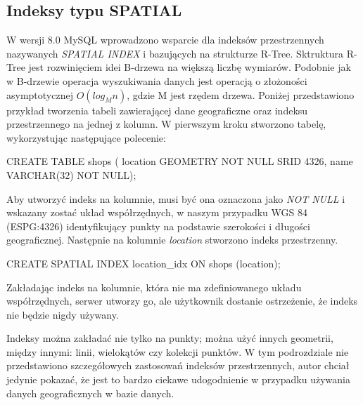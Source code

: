 \subsection{Indeksy typu SPATIAL}
W wersji 8.0 MySQL wprowadzono wsparcie dla indeksów przestrzennych nazywanych \textit{SPATIAL INDEX} i bazujących na strukturze R-Tree. Sktruktura R-Tree jest rozwinięciem idei B-drzewa na większą liczbę wymiarów. Podobnie jak w B-drzewie operacja wyszukiwania danych jest operacją o złożoności asymptotycznej $O(log_M n)$, gdzie M jest rzędem drzewa. Poniżej przedstawiono przykład tworzenia tabeli zawierającej dane geograficzne oraz indeksu przestrzennego na jednej z kolumn.
W pierwszym kroku stworzono tabelę, wykorzystując następujące polecenie:
\begin{spverbatim}
	CREATE TABLE shops (
	location GEOMETRY NOT NULL SRID 4326,
	name VARCHAR(32) NOT NULL);
\end{spverbatim}
Aby utworzyć indeks na kolumnie, musi być ona oznaczona jako \textit{NOT NULL} i wskazany zostać układ współrzędnych, w naszym przypadku WGS 84 (ESPG:4326) identyfikujący punkty na podstawie szerokości i długości geograficznej. Następnie na kolumnie \textit{location} stworzono indeks przestrzenny.
\begin{spverbatim}
	CREATE SPATIAL INDEX location_idx ON shops (location);
\end{spverbatim}
Zakładając indeks na kolumnie, która nie ma zdefiniowanego układu współrzędnych, serwer utworzy go, ale użytkownik dostanie ostrzeżenie, że indeks nie będzie nigdy używany. 

Indeksy można zakładać nie tylko na punkty; można użyć innych geometrii, między innymi: linii, wielokątów czy kolekcji punktów. W tym podrozdziale nie przedstawiono szczegółowych zastosowań indeksów przestrzennych, autor chciał jedynie pokazać, że jest to bardzo ciekawe udogodnienie w przypadku używania danych geograficznych w bazie danych.
